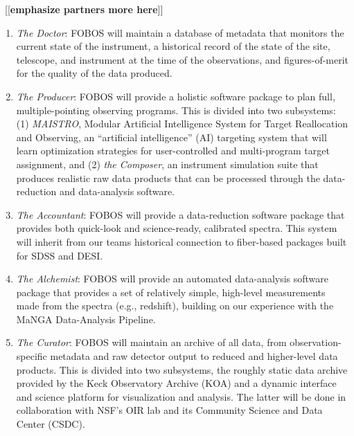 \documentclass[oneside,11pt]{amsart}
\newcommand{\comment}[2][todo]{{\color{#1}[[{\bf #2}]]}}
\begin{document}
~\comment{emphasize partners more here}

\begin{enumerate}
%
\item {\it The Doctor}: FOBOS will maintain a database of metadata
that monitors the current state of the instrument, a historical
record of the state of the site, telescope, and instrument at the
time of the observations, and figures-of-merit for the quality of the
data produced.
%
\item {\it The Producer}: FOBOS will provide a holistic software
package to plan full, multiple-pointing observing programs. This is
divided into two subsystems: (1) {\it MAISTRO}, Modular Artificial
Intelligence System for Target Reallocation and Observing, an
``artificial intelligence'' (AI) targeting system that will learn
optimization strategies for user-controlled and multi-program target
assignment, and (2) {\it the Composer}, an instrument simulation
suite that produces realistic raw data products that can be processed
through the data-reduction and data-analysis software.
%
\item {\it The Accountant}: FOBOS will provide a data-reduction
software package that provides both quick-look and science-ready,
calibrated spectra.  This system will inherit from our teams historical connection to fiber-based packages built for SDSS and DESI.
%
\item {\it The Alchemist}: FOBOS will provide an automated
data-analysis software package that provides a set of relatively
simple, high-level measurements made from the spectra (e.g.,
redshift), building on our experience with the MaNGA Data-Analysis
Pipeline.
%
\item {\it The Curator}: FOBOS will maintain an archive of all data,
from observation-specific metadata and raw detector output to reduced
and higher-level data products. This is divided into two subsystems,
the roughly static data archive provided by the Keck Observatory
Archive (KOA) and a dynamic interface and science platform for
visualization and analysis. The latter will be done in collaboration
with NSF's OIR lab and its Community Science and Data Center (CSDC).
%
\end{enumerate}


\end{document}
